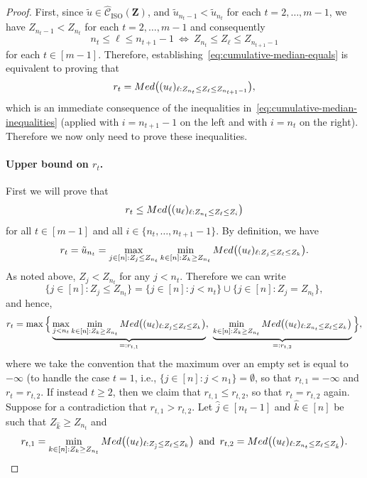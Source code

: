 \documentclass[12pt]{article}
\newcommand{\ISO}{\mathrm{ISO}}
\newcommand{\bZ}{\mathbf{Z}}
\begin{document}
\begin{proof}
    First, since $\tilde{u}\in\widehat{\mathcal{C}}_\ISO(\bZ)$, and $\tilde{u}_{n_t-1}<\tilde{u}_{n_t}$ for each $t=2,\dots,m-1$, we have 
    $Z_{n_t-1} < Z_{n_t}$ for each $t=2,\dots,m-1$ and consequently
    \[n_t \leq \ell\leq n_{t+1}-1 \ \Longleftrightarrow \ Z_{n_t}\leq Z_\ell \leq Z_{n_{t+1}-1}\]
    for each $t\in[m-1]$.
    Therefore, establishing~\eqref{eq:cumulative-median-equals} is equivalent to proving that
    \[r_t = \textnormal{Med}\bigl((u_\ell)_{\ell:Z_{n_t} \leq Z_\ell \leq Z_{n_{t+1}-1}}\bigr),\]
    which is an immediate consequence of the inequalities in~\eqref{eq:cumulative-median-inequalities} (applied with $i=n_{t+1}-1$ on the left and with $i=n_t$ on the right). Therefore we now only need to prove these inequalities.

    \paragraph{Upper bound on $r_t$.}
    First we will prove that
    \begin{equation}\label{eq:cumulative-median-inequalities-1}
    r_t\leq  \textnormal{Med}\bigl((u_\ell)_{\ell:Z_{n_t}\leq Z_\ell\leq Z_i}\bigr)
\end{equation}
for all $t\in [m-1]$ and all $i\in\{n_t,\dots,n_{t+1}-1\}$.
By definition, we have 
\[r_t = \tilde{u}_{n_t} = \max_{j\in [n]: Z_j\leq Z_{n_t}}\min_{k\in [n]: Z_k\geq Z_{n_t}} \textnormal{Med}\bigl((u_\ell)_{\ell:Z_j\leq Z_\ell\leq Z_k}\bigr).\]
As noted above, $Z_j < Z_{n_t}$ for any $j<n_t$. 
Therefore we can write
\[
\{j\in[n]: Z_j \leq Z_{n_t}\} = \{j\in[n]: j< n_t\} \cup \{j\in[n]: Z_j = Z_{n_t}\},
\]
and hence,
\[
r_t = \max\Big\{\underbrace{\max_{j < n_t}\min_{k\in [n]: Z_k\geq Z_{n_t}} \textnormal{Med}\bigl((u_\ell)_{\ell:Z_j\leq Z_\ell\leq Z_k}\bigr)}_{=:r_{t,1}} , \ \underbrace{\min_{k\in [n]: Z_k\geq Z_{n_t}} \textnormal{Med}\bigl((u_\ell)_{\ell:Z_{n_t}\leq Z_\ell\leq Z_k}\bigr)}_{=:r_{t,2}}\Big\},
\]
where we take the convention that the maximum over an empty set is equal to $-\infty$ (to handle the case $t=1$, i.e., $\{j\in[n]:j<n_1\}=\emptyset$, so that $r_{t,1}=-\infty$ and $r_t = r_{t,2}$. 
If instead $t\geq 2$, then we claim that $r_{t,1}\leq r_{t,2}$, so that $r_t = r_{t,2}$ again. Suppose for a contradiction that $r_{t,1}>r_{t,2}$. Let $\hat{j}\in [n_{t}-1]$ and $\hat{k}\in [n]$ be such that $Z_{\hat{k}} \geq Z_{n_t}$ and
\begin{equation}\label{eq:expression-rt1-rt2}
    r_{t,1}=\min_{k\in [n]: Z_k\geq Z_{n_t}} \textnormal{Med}\bigl((u_\ell)_{\ell:Z_{\hat{j}}\leq Z_\ell\leq Z_k}\bigr)\, \text{ and }\,r_{t,2}=\textnormal{Med}\bigl((u_\ell)_{\ell:Z_{n_t}\leq Z_\ell\leq Z_{\hat{k}}}\bigr).

\end{equation}
\end{proof}
\end{document}
